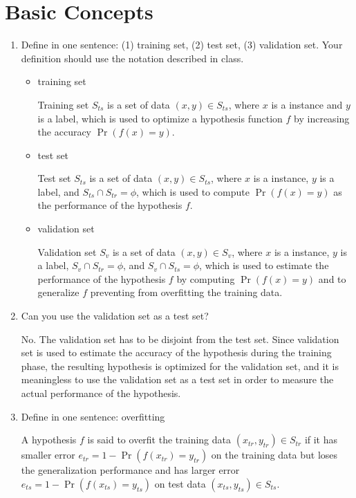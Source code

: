 \section{Basic Concepts}
\begin{enumerate}
\item Define in one sentence: (1) training set, (2) test set, (3) validation set. Your definition should use the notation described in class.
\begin{itemize}
\item training set

Training set $S_{ts}$ is a set of data $(x, y) \in S_{ts}$, where $x$ is a instance and $y$ is a label, which is used to optimize a hypothesis function $f$ by increasing the accuracy $\Pr(f(x)=y)$.

\item test set

Test set $S_{ts}$ is a set of data $(x, y) \in S_{ts}$, where $x$ is a instance, $y$ is a label, and $S_{ts} \cap S_{tr} = \phi$, which is used to compute $\Pr(f(x)=y)$ as the performance of the hypothesis $f$.

\item validation set

Validation set $S_{v}$ is a set of data $(x, y) \in S_{v}$, where $x$ is a instance, $y$ is a label, $S_{v} \cap S_{tr} = \phi$, and $S_{v} \cap S_{ts} = \phi$, which is used to estimate the performance of the hypothesis $f$ by computing $\Pr(f(x)=y)$ and to generalize $f$ preventing from overfitting the training data.

\end{itemize}

\item Can you use the validation set as a test set?

No. The validation set has to be disjoint from the test set. Since validation set is used to estimate the accuracy of the hypothesis during the training phase, the resulting hypothesis is optimized for the validation set, and it is meaningless to use the validation set as a test set in order to measure the actual performance of the hypothesis.

\item Define in one sentence: overfitting

A hypothesis $f$ is said to overfit the training data $(x_{tr}, y_{tr}) \in S_{tr}$ if it has smaller error $e_{tr} = 1 - \Pr(f(x_{tr})=y_{tr})$ on the training data but loses the generalization performance and has larger error $e_{ts} = 1 - \Pr(f(x_{ts})=y_{ts})$ on test data $(x_{ts}, y_{ts}) \in S_{ts}$.


\end{enumerate}
